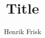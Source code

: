 \documentclass[11pt]{article}
\author{Henrik Frisk}
\date{ }
\title{Title}
\begin{document}
\section{}
\end{document}
